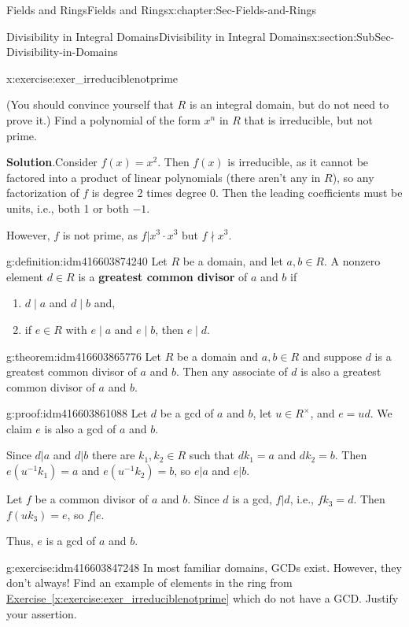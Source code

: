 \documentclass[oneside,10pt,]{book}
\newcommand{\terminology}[1]{\textbf{#1}}
\numberwithin{equation}{section}
\begin{document}
\begin{chapterptx}{Fields and Rings}{}{Fields and Rings}{}{}{x:chapter:Sec-Fields-and-Rings}
\begin{sectionptx}{Divisibility in Integral Domains}{}{Divisibility in Integral Domains}{}{}{x:section:SubSec-Divisibility-in-Domains}
\begin{inlineexercise}{}{x:exercise:exer_irreduciblenotprime}
%
\par
(You should convince yourself that \(R\) is an integral domain, but do not need to prove it.) Find a polynomial of the form \(x^n\) in \(R\) that is irreducible, but not prime.%
\par\smallskip%
\noindent\textbf{Solution}.\hypertarget{g:solution:idm416603879296}{}\quad{}Consider \(f(x) = x^2\). Then \(f(x)\) is irreducible, as it cannot be factored into a product of linear polynomials (there aren't any in \(R\)), so any factorization of \(f\) is degree 2 times degree 0. Then the leading coefficients must be units, i.e., both 1 or both \(-1\).%
\par
However, \(f\) is not prime, as \(f| x^3 \cdot x^3\) but \(f\nmid x^3\).%
\end{inlineexercise}
\begin{definition}{}{g:definition:idm416603874240}%
Let \(R\) be a domain, and let \(a,b\in R\). A nonzero element \(d\in R\) is a \terminology{greatest common divisor} of \(a\) and \(b\) if%
\begin{enumerate}
\item{}\(d\mid a\) and \(d\mid b\) and,%
\item{}if \(e\in R\) with \(e\mid a\) and \(e\mid b\), then \(e\mid d\).%
\end{enumerate}
%
\end{definition}
\begin{theorem}{}{}{g:theorem:idm416603865776}%
Let \(R\) be a domain and \(a,b\in R\) and suppose \(d\) is a greatest common divisor of \(a\) and \(b\). Then any associate of \(d\) is also a greatest common divisor of \(a\) and \(b\).%
\end{theorem}
\begin{proofptx}{}{g:proof:idm416603861088}
Let \(d\) be a gcd of \(a\) and \(b\), let \(u\in R^\times\), and \(e =ud\). We claim \(e\) is also a gcd of \(a\) and \(b\).%
\par
Since \(d|a\) and \(d|b\) there are \(k_1,k_2\in R\) such that \(d k_1 = a\) and \(d k_2 = b\). Then \(e (u^{-1} k_1) = a\) and \(e (u^{-1} k_2) = b\), so \(e|a\) and \(e|b\).%
\par
Let \(f\) be a common divisor of \(a\) and \(b\). Since \(d\) is a gcd, \(f|d\), i.e., \(f k_3 = d\). Then \(f (uk_3) = e\), so \(f|e\).%
\par
Thus, \(e\) is a gcd of \(a\) and \(b\).%
\end{proofptx}
\begin{inlineexercise}{}{g:exercise:idm416603847248}%
In most familiar domains, GCDs exist. However, they don't always! Find an example of elements in the ring from \hyperref[x:exercise:exer_irreduciblenotprime]{Exercise~\ref{x:exercise:exer_irreduciblenotprime}} which do not have a GCD. Justify your assertion.%

\end{inlineexercise}
\end{sectionptx}
\end{chapterptx}
\end{document}
